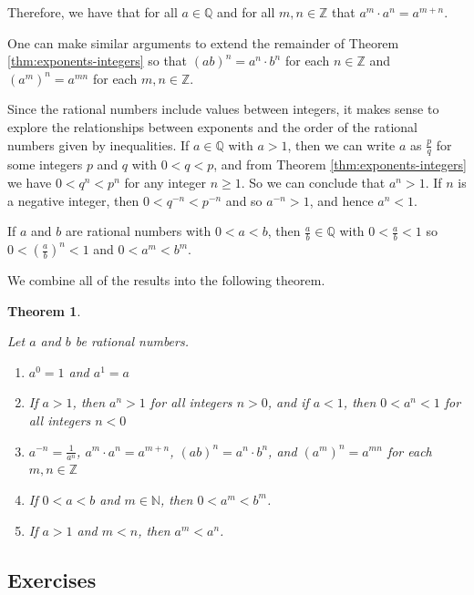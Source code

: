 \documentclass[
]{book}
\newtheorem{theorem}{Theorem}[chapter]
\theoremstyle{definition}
\theoremstyle{definition}
\theoremstyle{definition}
\theoremstyle{definition}
\theoremstyle{remark}
\begin{document}
Therefore, we have that for all \(a\in \mathbb{Q}\) and for all \(m,n\in \mathbb{Z}\) that \(a^m\cdot a^n = a^{m+n}\).

One can make similar arguments to extend the remainder of Theorem \ref{thm:exponents-integers} so that \((ab)^n=a^n\cdot b^n\) for each \(n\in \mathbb{Z}\) and \((a^m)^n = a^{mn}\) for each \(m,n\in \mathbb{Z}\).

Since the rational numbers include values between integers, it makes sense to explore the relationships between exponents and the order of the rational numbers given by inequalities. If \(a\in \mathbb{Q}\) with \(a>1\), then we can write \(a\) as \(\frac{p}{q}\) for some integers \(p\) and \(q\) with \(0<q<p\), and from Theorem \ref{thm:exponents-integers} we have \(0<q^n<p^n\) for any integer \(n\geq 1\). So we can conclude that \(a^n>1\). If \(n\) is a negative integer, then \(0<q^{-n}<p^{-n}\) and so \(a^{-n} >1\), and hence \(a^n<1\).

If \(a\) and \(b\) are rational numbers with \(0<a<b\), then \(\frac{a}{b}\in \mathbb{Q}\) with \(0<\frac{a}{b}<1\) so \(0<\left(\frac{a}{b}\right)^n<1\) and \(0<a^m<b^m\).

We combine all of the results into the following theorem.

\begin{theorem}
\protect\hypertarget{thm:exponents-rationals}{}\label{thm:exponents-rationals}

Let \(a\) and \(b\) be rational numbers.

\begin{enumerate}
\def\labelenumi{\arabic{enumi}.}
\item
  \(a^0=1\) and \(a^1=a\)
\item
  If \(a>1\), then \(a^n >1\) for all integers \(n>0\), and if \(a<1\), then \(0<a^n<1\) for all integers \(n<0\)
\item
  \(a^{-n} = \frac{1}{a^n}\), \(a^m\cdot a^n = a^{m+n}\), \((ab)^n=a^n\cdot b^n\), and \((a^m)^n = a^{mn}\) for each \(m,n\in \mathbb{Z}\)
\item
  If \(0<a<b\) and \(m\in \mathbb{N}\), then \(0<a^m<b^m\).
\item
  If \(a>1\) and \(m<n\), then \(a^m<a^n\).
\end{enumerate}

\end{theorem}

\hypertarget{exercises-13}{%
\subsection{Exercises}\label{exercises-13}}
\end{document}
